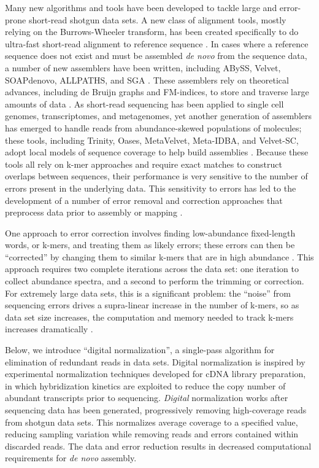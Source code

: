 \documentclass{pnastwo}
\begin{document}
\begin{article}
Many new algorithms and tools have been developed to tackle large and
error-prone short-read shotgun data sets. A new class of alignment
tools, mostly relying on the Burrows-Wheeler transform, has been
created specifically to do ultra-fast short-read alignment to
reference sequence \cite{pubmed19430453}.  In cases where a reference
sequence does not exist and must be assembled {\em de novo} from the
sequence data, a number of new assemblers have been written, including
ABySS, Velvet, SOAPdenovo, ALLPATHS, and SGA
\cite{pubmed20211242,pubmed21187386,pubmed22156294}.  These assemblers
rely on theoretical advances, including de Bruijn graphs and
FM-indices, to store and traverse large amounts of data
\cite{pubmed22068540,pubmed20529929}.  As short-read sequencing has
been applied to single cell genomes, transcriptomes, and metagenomes,
yet another generation of assemblers has emerged to handle reads from
abundance-skewed populations of molecules; these tools, including
Trinity, Oases, MetaVelvet, Meta-IDBA, and Velvet-SC, adopt local
models of sequence coverage to help build assemblies
\cite{pubmed21572440,pubmed22368243,metavelvet,pubmed21685107,pubmed21926975}.
Because these tools all rely on k-mer approaches and require exact
matches to construct overlaps between sequences, their performance is
very sensitive to the number of errors present in the underlying data.
This sensitivity to errors has led to the development of a number of
error removal and correction approaches that preprocess data prior to
assembly or mapping
\cite{pubmed21685062,pubmed15059830,pubmed21114842}.

One approach to error correction involves finding low-abundance
fixed-length words, or k-mers, and treating them as likely errors;
these errors can then be ``corrected'' by changing them to similar
k-mers that are in high abundance \cite{pubmed21114842}.  This
approach requires two complete iterations across the data set: one
iteration to collect abundance spectra, and a second to perform the
trimming or correction.  For extremely large data sets, this is a
significant problem: the ``noise'' from sequencing errors drives a
supra-linear increase in the number of k-mers, so as data set size
increases, the computation and memory needed to track k-mers increases
dramatically \cite{pubmed21245053}.


Below, we introduce ``digital normalization'', a single-pass algorithm
for elimination of redundant reads in data sets.  Digital
normalization is inspired by experimental normalization techniques
developed for cDNA library preparation, in which hybridization
kinetics are exploited to reduce the copy number of abundant
transcripts prior to sequencing\cite{pubmed8889548,pubmed7937745}.
{\em Digital} normalization works after sequencing data has been
generated, progressively removing high-coverage reads from shotgun
data sets.  This normalizes average coverage to a specified value,
reducing sampling variation while removing reads and errors contained
within discarded reads.  The data and error reduction results in
decreased computational requirements for {\em de novo} assembly.


\end{article}
\end{document}
